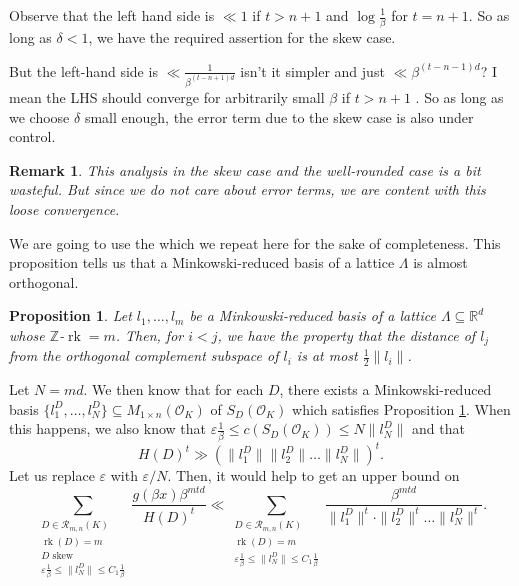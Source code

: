 \documentclass{amsart}
\newcommand{\vlad}{\color{brown}}
\newtheorem{proposition}[theorem]{Proposition}
\newtheorem{remark}[theorem]{Remark}
\newcommand{\OK}{\mathcal{O}_K}
\DeclareMathOperator{\rank}{rk}
\begin{document}
Observe that the left hand side is $\ll 1$ if $t>n+1$ and $ \log \frac{1}{\beta}$ for $t=n+1$. So as long as $\delta < 1$, we have the required assertion for the skew case.
\par
\iffalse

But the left-hand side is $\ll \frac{1}{\beta^{( t-n+1 )d}}$ {\vlad isn't it simpler and just $\ll\beta^{( t-n-1 )d}$? I mean the LHS should converge for arbitrarily small $\beta$ if $t>n+1$ }. So as long as we choose $\delta$ small enough, the error term due to the skew case is also under control.
\begin{remark}
\label{re:wasteful}
This analysis in the skew case and the well-rounded case is a bit wasteful. But since we do not care about error terms, we are content with this loose convergence.
\end{remark}
We are going to use the \cite[Proposition 2]{K1994} which we repeat here for the sake of completeness. 
This proposition tells us that a Minkowski-reduced basis of a lattice $\Lambda$ is almost orthogonal.
\begin{proposition}
	\label{pr:reduced_orthogonal}
Let $l_1,\dots,l_m$ be a Minkowski-reduced basis of a 
lattice 
$\Lambda \subseteq \mathbb{R}^{d}$ 
whose $\mathbb{Z}$-$\rank=m$. Then, for $i<j$, we 
have the property that the distance of $l_j$ from the orthogonal complement 
subspace of $l_i$ is at most $\tfrac{1}{2} \|l_i\|$.
\end{proposition}
Let $N = md$.
We then know that for each $D$, there exists a Minkowski-reduced basis $\{l_1^{D},\dots,l_N^{D}\}  \subseteq M_{1 \times n}(\OK)$ of 
$S_{D}(\OK)$ which satisfies Proposition \ref{pr:reduced_orthogonal}. 
When this happens, we also know that $ \varepsilon \frac{1}{\beta}  \leq  c(S_D(\OK)) \leq  N \|l_{N}^{D}\| $ and that 
\begin{equation}
  H(D)^{t} \gg \left( \|l_1^{D}\| \|l_{2}^{D}\| \dots \|l_{N}^{D}\| \right)^{t}.
\end{equation}
Let us replace $\varepsilon$ with $\varepsilon/N$. Then, it would help to get an upper bound on 
\begin{equation}
	\sum_{\substack{D \in \mathcal{R}_{m,n}(K) \\  \rank(D) = m \\ D \text{ skew} \\ \varepsilon\frac{1}{\beta}\leq \|l_N^{D}\| \leq C_1\frac{ 1 }{\beta}}}
	\frac{  g(\beta x )\beta^{mtd} }{ H(D)^{t} } \ll 
	\sum_{\substack{D \in \mathcal{R}_{m,n}(K) \\  \rank(D) = m \\  \varepsilon\frac{1}{\beta}\leq \|l_N^{D}\| \leq C_1\frac{ 1 }{\beta}}}
	\frac{\beta^{mtd}}{ \|l^{D}_1\|^{t} \cdot \|l^{D}_2\|^{t}\dots \|l^{D}_N\|^{t}}.
\end{equation}
\end{document}
